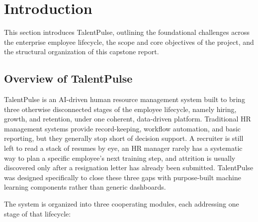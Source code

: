 \documentclass[11pt,a4paper]{article}
\begin{document}
\clearpage
\pagestyle{fancy}

\tableofcontents
\clearpage
\listoffigures
\clearpage
\listoftables
\clearpage
{}
\setcounter{page}{1}

\section{Introduction}
\label{sec:intro}

This section introduces TalentPulse, outlining the foundational challenges across the enterprise employee lifecycle, the scope and core objectives of the project, and the structural organization of this capstone report.

\subsection{Overview of TalentPulse}

TalentPulse is an AI-driven human resource management system built to bring three otherwise disconnected stages of the employee lifecycle, namely hiring, growth, and retention, under one coherent, data-driven platform. Traditional HR management systems provide record-keeping, workflow automation, and basic reporting, but they generally stop short of decision support. A recruiter is still left to read a stack of resumes by eye, an HR manager rarely has a systematic way to plan a specific employee's next training step, and attrition is usually discovered only after a resignation letter has already been submitted. TalentPulse was designed specifically to close these three gaps with purpose-built machine learning components rather than generic dashboards.

The system is organized into three cooperating modules, each addressing one stage of that lifecycle:
\end{document}
